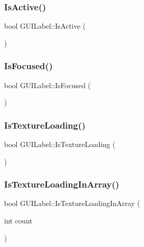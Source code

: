 \subsubsection{\texorpdfstring{Is\+Active()}{IsActive()}}
{\footnotesize\ttfamily bool G\+U\+I\+Label\+::\+Is\+Active (\begin{DoxyParamCaption}{ }\end{DoxyParamCaption})}

\hypertarget{class_g_u_i_label_a444a4f0b0a8db18dd259d9f1870099a4}{}\label{class_g_u_i_label_a444a4f0b0a8db18dd259d9f1870099a4} 
\subsubsection{\texorpdfstring{Is\+Focused()}{IsFocused()}}
{\footnotesize\ttfamily bool G\+U\+I\+Label\+::\+Is\+Focused (\begin{DoxyParamCaption}{ }\end{DoxyParamCaption})}

\hypertarget{class_g_u_i_label_aa09ab389aed05ee5ad454ebb4366bd59}{}\label{class_g_u_i_label_aa09ab389aed05ee5ad454ebb4366bd59} 
\subsubsection{\texorpdfstring{Is\+Texture\+Loading()}{IsTextureLoading()}}
{\footnotesize\ttfamily bool G\+U\+I\+Label\+::\+Is\+Texture\+Loading (\begin{DoxyParamCaption}{ }\end{DoxyParamCaption})}

\hypertarget{class_g_u_i_label_ab9e51389fe5807258920293f5d71b879}{}\label{class_g_u_i_label_ab9e51389fe5807258920293f5d71b879} 
\subsubsection{\texorpdfstring{Is\+Texture\+Loading\+In\+Array()}{IsTextureLoadingInArray()}}
{\footnotesize\ttfamily bool G\+U\+I\+Label\+::\+Is\+Texture\+Loading\+In\+Array (\begin{DoxyParamCaption}\item[{int}]{count }\end{DoxyParamCaption})}

